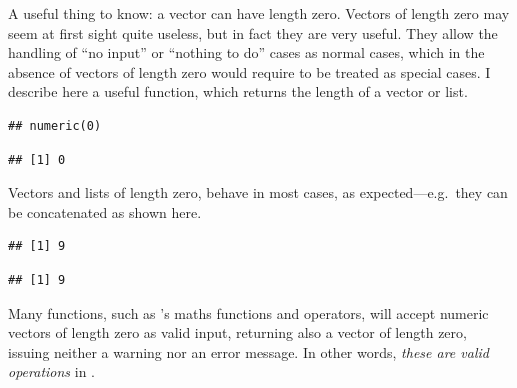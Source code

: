 \documentclass[krantz2]{krantz}\usepackage{knitr}%
\begin{document}
\begin{explainbox}
A useful thing to know: a vector can have length zero. Vectors of length zero may seem at first sight quite useless, but in fact they are very useful. They allow the handling of ``no input'' or ``nothing to do'' cases as normal cases, which in the absence of vectors of length zero would require to be treated as special cases. I describe here a useful function,  which returns the length of a vector or list.

\begin{knitrout}\footnotesize
{}\color{fgcolor}\begin{kframe}
\begin{alltt}
 \hlkwb{<-} \hlstd{(}\hlstd{)}
\end{alltt}
\begin{verbatim}
## numeric(0)
\end{verbatim}
\begin{alltt}
\end{alltt}
\begin{verbatim}
## [1] 0
\end{verbatim}
\end{kframe}
\end{knitrout}

Vectors and lists of length zero, behave in most cases, as expected---e.g.\ they can be concatenated as shown here.

\begin{knitrout}\footnotesize
{}\color{fgcolor}\begin{kframe}
\begin{alltt}
\hlstd{(} \hlstd{(}
\end{alltt}
\begin{verbatim}
## [1] 9
\end{verbatim}
\begin{alltt}
\hlstd{(}
\end{alltt}
\begin{verbatim}
## [1] 9
\end{verbatim}
\end{kframe}
\end{knitrout}

Many functions, such as \Rlang's maths functions and operators, will accept numeric vectors of length zero as valid input, returning also a vector of length zero, issuing neither a warning nor an error message. In other words, \emph{these are valid operations} in \Rlang.


\end{explainbox}
\end{document}
